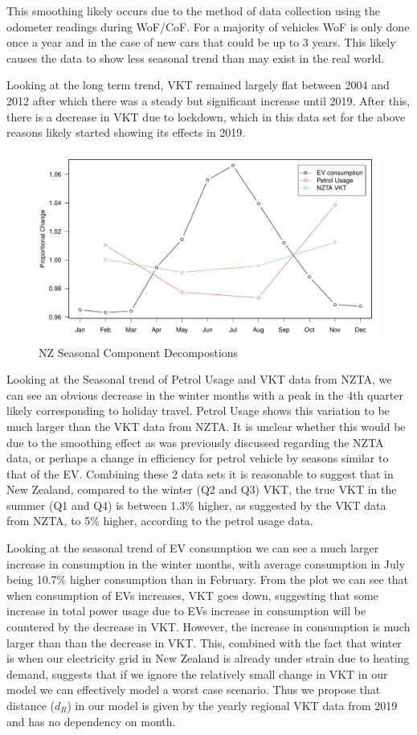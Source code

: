 \documentclass[
]{article}
\begin{document}
This smoothing likely occurs due to the method of data collection using
the odometer readings during WoF/CoF. For a majority of vehicles WoF is
only done once a year and in the case of new cars that could be up to 3
years. This likely causes the data to show less seasonal trend than may
exist in the real world.

Looking at the long term trend, VKT remained largely flat between 2004
and 2012 after which there was a steady but significant increase until
2019. After this, there is a decrease in VKT due to lockdown, which in
this data set for the above reasons likely started showing its effects
in 2019.

\begin{figure}
\centering
\includegraphics{final_report_files/figure-latex/petrol_VKT_vs_eff-1.pdf}
\caption{NZ Seasonal Component Decompostions}
\end{figure}

Looking at the Seasonal trend of Petrol Usage and VKT data from NZTA, we
can see an obvious decrease in the winter months with a peak in the 4th
quarter likely corresponding to holiday travel. Petrol Usage shows this
variation to be much larger than the VKT data from NZTA. It is unclear
whether this would be due to the smoothing effect as was previously
discussed regarding the NZTA data, or perhaps a change in efficiency for
petrol vehicle by seasons similar to that of the EV. Combining these 2
data sets it is reasonable to suggest that in New Zealand, compared to
the winter (Q2 and Q3) VKT, the true VKT in the summer (Q1 and Q4) is
between 1.3\% higher, as suggested by the VKT data from NZTA, to 5\%
higher, according to the petrol usage data.

Looking at the seasonal trend of EV consumption we can see a much larger
increase in consumption in the winter months, with average consumption
in July being 10.7\% higher consumption than in February. From the plot
we can see that when consumption of EVs increases, VKT goes down,
suggesting that some increase in total power usage due to EVs increase
in consumption will be countered by the decrease in VKT. However, the
increase in consumption is much larger than than the decrease in VKT.
This, combined with the fact that winter is when our electricity grid in
New Zealand is already under strain due to heating demand, suggests that
if we ignore the relatively small change in VKT in our model we can
effectively model a worst case scenario. Thus we propose that distance
(\(d_{R}\)) in our model is given by the yearly regional VKT data from
2019 and has no dependency on month.
\end{document}
